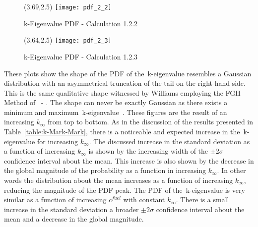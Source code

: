 	\vspace{0.2in}
	\begin{figure}[htbp]
		\begin{center}
			\begin{minipage}[t]{3.69in}
			\begin{picture}(3.69,2.5)
	            	{\texttt{[image: pdf\_2\_2]}}
			\end{picture}
			\caption{\label{fig:PDF-2.1} k-Eigenvalue PDF - Calculation 1.2.2}
			\end{minipage} %
		\end{center}
	\end{figure}	
	\vspace{-0.25in}
	
	\vspace{0.2in}
	\begin{figure}[htbp]
		\begin{center}
			\begin{minipage}[t]{3.64in}
			\begin{picture}(3.64,2.5)
	            	{\texttt{[image: pdf\_2\_3]}}
			\end{picture}
			\caption{\label{fig:PDF-2.1} k-Eigenvalue PDF - Calculation 1.2.3}
			\end{minipage} %
		\end{center}
	\end{figure}	
	\vspace{-0.25in}
	These plots show the shape of the PDF of the~k-eigenvalue resembles a Gaussian
	distribution with an asymmetrical truncation of the tail on the right-hand side.  This is
	the same qualitative shape witnessed by Williams employing the FGH Method
	of~\cite{Wil:00a} - \cite{Wil:01}.  The shape can never be exactly Gaussian as there exists
	a minimum and maximum~k-eigenvalue~\cite{Wil:00a}.  These figures are the result of an
	increasing ${k_{\infty}}$ from top to bottom.  As in the discussion of the results presented
	in Table~\ref{table:k-Mark-Mark}, there is a noticeable and expected increase in
	the~k-eigenvalue for increasing ${k_{\infty}}$.  The discussed increase in the standard
	deviation as a function of increasing ${k_{\infty}}$ is shown by the increasing width of the
	${\pm 2\sigma}$ confidence interval about the mean.  This increase is also shown by the 
	decrease in the global magnitude of the probability as a function in increasing ${k_{\infty}}$.
	In other words the distribution about the mean increases as a function of increasing
	${k_{\infty}}$, reducing the magnitude of the PDF peak.  The PDF of the~k-eigenvalue is 
	very similar as a function of increasing ${c^{fuel}}$ with constant ${k_{\infty}}$.  There is a
	small increase in the standard deviation a broader ${\pm 2\sigma}$ confidence interval
	about the mean and a decrease in the global magnitude.  
	
